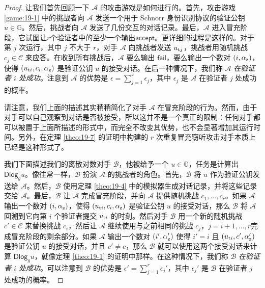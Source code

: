 \begin{proof}
让我们首先回顾一下 $\mathcal{A}$ 的攻击游戏是如何进行的。首先，攻击游戏 \ref{game:19-1} 中的挑战者向 $\mathcal{A}$ 发送一个用于 Schnorr 身份识别协议的验证公钥 $u\in\mathbb{G}$。然后，挑战者向 $\mathcal{A}$ 发送了几份交互的对话记录。最后，$\mathcal{A}$ 进入冒充阶段，它试图让$r$个验证者中的至少一个输出$\mathsf{accept}$。更详细的过程是这样的。对于第 $j$ 次运行，其中 $j$ 不大于 $r$，对手 $\mathcal{A}$ 向挑战者发送 $u_{{\rm t}j}$，挑战者用随机挑战 $c_j\in\mathcal{C}$ 来应答。在收到所有挑战后，$\mathcal{A}$ 要么输出 $\mathsf{fail}$，要么输出一个数对 $(i,\alpha_{\rm z})$，使得 $(u_{{\rm t}i},c_i,\alpha_{\rm z})$ 是验证公钥 $u$ 的接受对话。在后一种情况下，我们称 $\mathcal{A}$ \emph{在验证者 $i$ 处成功}。注意到 $\mathcal{A}$ 的优势是 $\epsilon=\sum_{j=1}^r\epsilon_j$，其中 $\epsilon_j$ 是 $\mathcal{A}$ 在验证者 $j$ 处成功的概率。

请注意，我们上面的描述其实稍稍简化了对手 $\mathcal{A}$ 在冒充阶段的行为。然而，由于对手可以自己观察到对话是否被接受，所以这并不是一个真正的限制：任何对手都可以被置于上面所描述的形式中，而完全不改变其优势，也不会显著增加其运行时间。另外，在定理 \ref{theo:19-7} 的证明中构建的 $r$ 次重复冒充窃听攻击对手本质上已经是这种形式了。

我们下面描述我们的离散对数对手 $\mathcal{B}$，他被给予一个 $u\in\mathbb{G}$，任务是计算出 $\mathsf{Dlog}_gu$。像往常一样，$\mathcal{B}$ 扮演 $\mathcal{A}$ 的挑战者的角色。首先，$\mathcal{B}$ 将 $u$ 作为验证公钥发送给 $\mathcal{A}$。然后，$\mathcal{B}$ 使用定理 \ref{theo:19-4} 中的模拟器生成对话记录，并将这些记录交给 $\mathcal{A}$。最后，$\mathcal{B}$ 让 $\mathcal{A}$ 完成冒充阶段，并向 $\mathcal{A}$ 提供随机挑战 $c_1,\dots,c_r$。如果 $\mathcal{A}$ 输出一个数对 $(i,\alpha_{\rm z})$，使得 $(u_{{\rm t}i},c_i,\alpha_{\rm z})$ 是验证公钥 $u$ 的接受对话，那么 $\mathcal{B}$ 将 $\mathcal{A}$ 回溯到它向第 $i$ 个验证者提交 $u_{{\rm t}i}$ 的时刻。然后对手 $\mathcal{B}$ 用一个新的随机挑战 $c'\in\mathcal{C}$ 来替换挑战 $c_i$，然后让 $\mathcal{A}$ 继续使用与之前相同的挑战 $c_j$，$j=i+1,\dots,r$完成冒充阶段的剩余部分。如果 $\mathcal{A}$ 输出一个数对 $(i',\alpha_{\rm z}')$ 使得 $i'=i$ 且 $(u_{{\rm t}i},c',\alpha_{\rm z}')$ 是验证公钥 $u$ 的接受对话，并且 $c'\neq c$，那么 $\mathcal{B}$ 就可以使用这两个接受对话来计算 $\mathsf{Dlog}_gu$，就像定理 \ref{theo:19-1} 的证明中那样。在这种情况下，我们称 $\mathcal{B}$ \emph{在验证者 $i$ 处成功}。可以注意到 $\mathcal{B}$ 的优势是 $\epsilon'=\sum_{j=1}^r\epsilon_j'$，其中 $\epsilon_j'$ 是 $\mathcal{B}$ 在验证者 $j$ 处成功的概率。


\end{proof}
